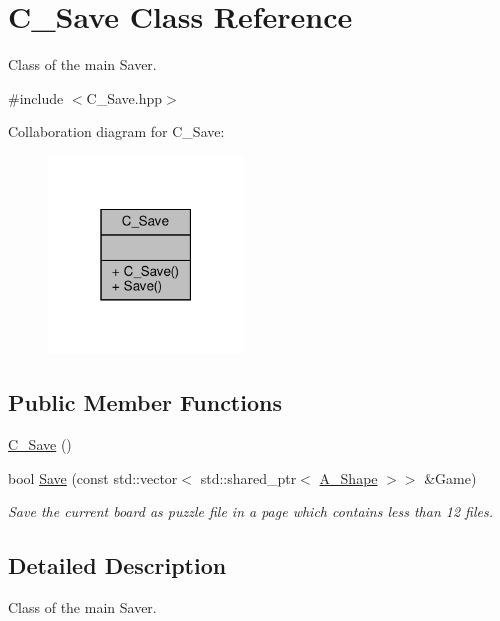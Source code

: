 \hypertarget{classC__Save}{}\section{C\+\_\+\+Save Class Reference}
\label{classC__Save}


Class of the main Saver.  




{\ttfamily \#include $<$C\+\_\+\+Save.\+hpp$>$}



Collaboration diagram for C\+\_\+\+Save\+:\nopagebreak
\begin{figure}[H]
\begin{center}
\leavevmode
\includegraphics[width=147pt]{classC__Save__coll__graph}
\end{center}
\end{figure}
\subsection*{Public Member Functions}
\begin{DoxyCompactItemize}
\item 
\hyperlink{classC__Save_adc49f753d7b0f40c95ec2b93f81b9672}{C\+\_\+\+Save} ()
\item 
bool \hyperlink{classC__Save_a144be848679b771afb9cf410710308e8}{Save} (const std\+::vector$<$ std\+::shared\+\_\+ptr$<$ \hyperlink{classA__Shape}{A\+\_\+\+Shape} $>$$>$ \&Game)
\begin{DoxyCompactList}\small\item\em Save the current board as puzzle file in a page which contains less than 12 files. \end{DoxyCompactList}\end{DoxyCompactItemize}


\subsection{Detailed Description}
Class of the main Saver. 

